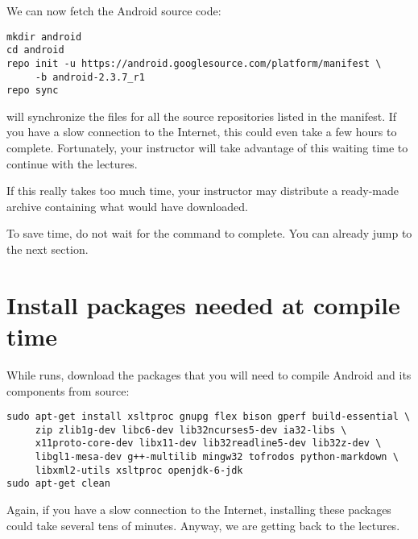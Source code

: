 We can now fetch the Android source code:\\

\begin{verbatim}
mkdir android
cd android
repo init -u https://android.googlesource.com/platform/manifest \
     -b android-2.3.7_r1
repo sync
\end{verbatim}

 will synchronize the files for all the source repositories listed
in the manifest. If you have a slow connection to the Internet, this could even
take a few hours to complete. Fortunately, your instructor will take advantage
of this waiting time to continue with the lectures.

If this really takes too much time, your instructor may distribute a ready-made archive
containing what \code{repo sync} would have downloaded. 

To save time, do not wait for the  command to complete. You can
already jump to the next section.

\section{Install packages needed at compile time}

While  runs, download the packages that you will need to 
compile Android and its components from source:  

\begin{verbatim}
sudo apt-get install xsltproc gnupg flex bison gperf build-essential \
     zip zlib1g-dev libc6-dev lib32ncurses5-dev ia32-libs \
     x11proto-core-dev libx11-dev lib32readline5-dev lib32z-dev \
     libgl1-mesa-dev g++-multilib mingw32 tofrodos python-markdown \
     libxml2-utils xsltproc openjdk-6-jdk
sudo apt-get clean
\end{verbatim}

Again, if you have a slow connection to the Internet, installing these packages
could take several tens of minutes. Anyway, we are getting back to the lectures.
